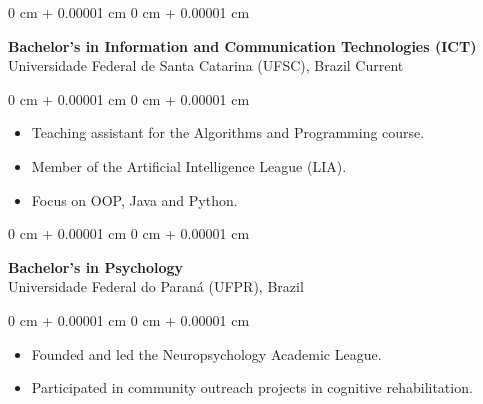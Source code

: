 \documentclass[10pt, letterpaper]{article}
\newenvironment{highlights}{
    \begin{itemize}[
        topsep=0.10 cm,
        parsep=0.10 cm,
        partopsep=0pt,
        itemsep=0pt,
        leftmargin=0 cm + 10pt
    ]
}{
    \end{itemize}
}
\newenvironment{onecolentry}{
    \begin{adjustwidth}{
        0 cm + 0.00001 cm
    }{
        0 cm + 0.00001 cm
    }
}{
    \end{adjustwidth}
}
\begin{document}
\begin{onecolentry}
    \setcolumnwidth{\fill, 4.5cm}
    \begin{paracol}{2}
        \textbf{Bachelor's in Information and Communication Technologies (ICT)} \\ Universidade Federal de Santa Catarina (UFSC), Brazil
        \switchcolumn
        \raggedleft Current
    \end{paracol}
\end{onecolentry}
\vspace{0.10cm}
\begin{onecolentry}
    \begin{highlights}
                \item Teaching assistant for the Algorithms and Programming course.
                \item Member of the Artificial Intelligence League (LIA).
                \item Focus on OOP, Java and Python.
    \end{highlights}
\end{onecolentry}

\vspace{0.2cm}

\begin{onecolentry}
    \setcolumnwidth{\fill, 4.5cm}
    \begin{paracol}{2}
        \textbf{Bachelor's in Psychology} \\ Universidade Federal do Paraná (UFPR), Brazil
        \switchcolumn
    \end{paracol}
\end{onecolentry}
\vspace{0.10cm}
\begin{onecolentry}
    \begin{highlights}
                \item Founded and led the Neuropsychology Academic League.
                \item Participated in community outreach projects in cognitive rehabilitation.
    \end{highlights}
\end{onecolentry}
\end{document}
